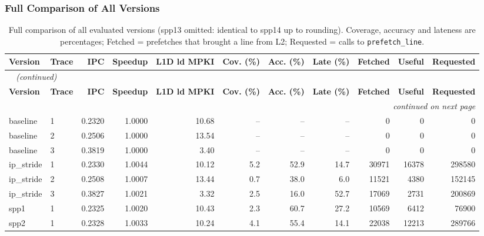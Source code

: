 \documentclass[12pt, a4paper]{article}
\newcommand{\tablesetup}{\small\renewcommand{\arraystretch}{1.15}\setlength{\tabcolsep}{4pt}}
\newcommand{\colhead}[1]{\textbf{#1}}
\begin{document}
\subsubsection{Full Comparison of All Versions}\label{sec:task1-full}
\FloatBarrier  %
\begingroup
\tablesetup \scriptsize
\begin{longtable}{llrrrrrrrrr}
\caption{Full comparison of all evaluated versions (spp13 omitted: identical to spp14 up to rounding). Coverage, accuracy and lateness are percentages; Fetched = prefetches that brought a line from L2; Requested = calls to \texttt{prefetch\_line}.}\label{tab:full}\\
\toprule
\rowcolor{tablehead}\colhead{Version} & \colhead{Trace} & \colhead{IPC} & \colhead{Speedup} & \colhead{L1D ld MPKI} & \colhead{Cov. (\%)} & \colhead{Acc. (\%)} & \colhead{Late (\%)} & \colhead{Fetched} & \colhead{Useful} & \colhead{Requested} \\
\midrule
\endfirsthead
\multicolumn{11}{l}{\small\itshape\color{muted}\tablename~\thetable{} (continued)}\\
\toprule
\rowcolor{tablehead}\colhead{Version} & \colhead{Trace} & \colhead{IPC} & \colhead{Speedup} & \colhead{L1D ld MPKI} & \colhead{Cov. (\%)} & \colhead{Acc. (\%)} & \colhead{Late (\%)} & \colhead{Fetched} & \colhead{Useful} & \colhead{Requested} \\
\midrule
\endhead
\midrule
\multicolumn{11}{r}{\small\itshape\color{muted}continued on next page}\\
\endfoot
\bottomrule
\endlastfoot
baseline & 1 & 0.2320 & 1.0000 & 10.68 & -- & -- & -- & 0 & 0 & 0 \\
baseline & 2 & 0.2506 & 1.0000 & 13.54 & -- & -- & -- & 0 & 0 & 0 \\
baseline & 3 & 0.3819 & 1.0000 & 3.40 & -- & -- & -- & 0 & 0 & 0 \\
ip\_stride & 1 & 0.2330 & 1.0044 & 10.12 & 5.2 & 52.9 & 14.7 & 30971 & 16378 & 298580 \\
ip\_stride & 2 & 0.2508 & 1.0007 & 13.44 & 0.7 & 38.0 & 6.0 & 11521 & 4380 & 152145 \\
ip\_stride & 3 & 0.3827 & 1.0021 & 3.32 & 2.5 & 16.0 & 52.7 & 17069 & 2731 & 200869 \\
spp1 & 1 & 0.2325 & 1.0020 & 10.43 & 2.3 & 60.7 & 27.2 & 10569 & 6412 & 76900 \\
spp2 & 1 & 0.2328 & 1.0033 & 10.24 & 4.1 & 55.4 & 14.1 & 22038 & 12213 & 289766 \\

\end{longtable}
\end{document}

